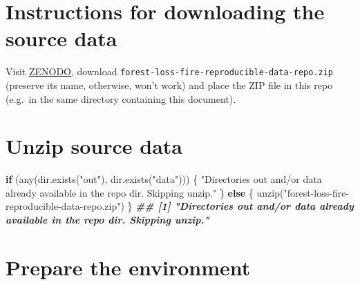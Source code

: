 \documentclass[10pt,landscape,a3paper]{article}
\newenvironment{Shaded}{\begin{snugshade}}{\end{snugshade}}
\newcommand{\ControlFlowTok}[1]{\textcolor[rgb]{0.13,0.29,0.53}{\textbf{#1}}}
\newcommand{\DocumentationTok}[1]{\textcolor[rgb]{0.56,0.35,0.01}{\textbf{\textit{#1}}}}
\newcommand{\FunctionTok}[1]{\textcolor[rgb]{0.00,0.00,0.00}{#1}}
\newcommand{\NormalTok}[1]{#1}
\newcommand{\StringTok}[1]{\textcolor[rgb]{0.31,0.60,0.02}{#1}}
\begin{document}
\hypertarget{instructions-for-downloading-the-source-data}{%
\section{Instructions for downloading the source
data}\label{instructions-for-downloading-the-source-data}}

Visit \href{https://doi.org/10.5281/zenodo.5682103}{ZENODO}, download
\texttt{forest-loss-fire-reproducible-data-repo.zip} (preserve its name,
otherwise, won't work) and place the ZIP file in this repo (e.g.~in the
same directory containing this document).

\hypertarget{unzip-source-data}{%
\section{Unzip source data}\label{unzip-source-data}}

\begin{Shaded}
\begin{Highlighting}[]
\ControlFlowTok{if}\NormalTok{ (}\FunctionTok{any}\NormalTok{(}\FunctionTok{dir.exists}\NormalTok{(}\StringTok{"out"}\NormalTok{), }\FunctionTok{dir.exists}\NormalTok{(}\StringTok{"data"}\NormalTok{))) \{}
    \StringTok{"Directories \textquotesingle{}out\textquotesingle{} and/or \textquotesingle{}data\textquotesingle{} already available in the repo dir. Skipping unzip."}
\NormalTok{\} }\ControlFlowTok{else}\NormalTok{ \{}
    \FunctionTok{unzip}\NormalTok{(}\StringTok{"forest{-}loss{-}fire{-}reproducible{-}data{-}repo.zip"}\NormalTok{)}
\NormalTok{\}}
\DocumentationTok{\#\# [1] "Directories \textquotesingle{}out\textquotesingle{} and/or \textquotesingle{}data\textquotesingle{} already available in the repo dir. Skipping unzip."}
\end{Highlighting}
\end{Shaded}

\hypertarget{prepare-the-environment}{%
\section{Prepare the environment}\label{prepare-the-environment}}
\end{document}
